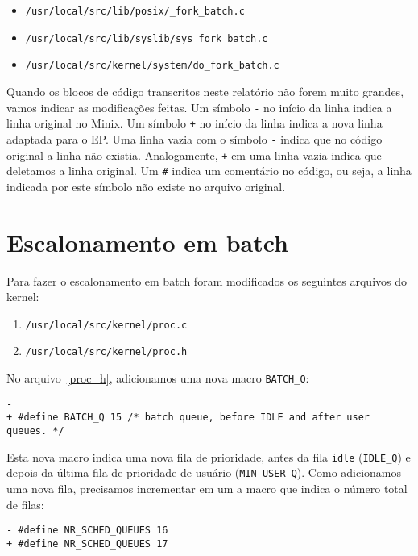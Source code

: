\documentclass{amsart}
\theoremstyle{plain}
\newcommand{\code}[1]{\lstinline[mathescape=true]{#1}}
\begin{document}
\begin{itemize}
  \item \code{/usr/local/src/lib/posix/_fork_batch.c}
  \item \code{/usr/local/src/lib/syslib/sys_fork_batch.c}
  \item \code{/usr/local/src/kernel/system/do_fork_batch.c}
\end{itemize}

Quando os blocos de código transcritos neste relatório não forem muito grandes, vamos indicar as
modificações feitas. Um símbolo \code{-} no início da linha indica a linha original no Minix. Um
símbolo \code{+} no início da linha indica a nova linha adaptada para o EP\@. Uma linha vazia com o
símbolo \code{-} indica que no código original a linha não existia. Analogamente, \code{+} em uma
linha vazia indica que deletamos a linha original. Um \code{#} indica um comentário no código, ou
seja, a linha indicada por este símbolo não existe no arquivo original.

\section{Escalonamento em batch}

Para fazer o escalonamento em batch foram modificados os seguintes arquivos do kernel:

\begin{enumerate}
  \item\label{proc_c} \code{/usr/local/src/kernel/proc.c}
  \item\label{proc_h} \code{/usr/local/src/kernel/proc.h}
\end{enumerate}

No arquivo~\ref{proc_h}, adicionamos uma nova macro \code{BATCH_Q}:

\begin{lstlisting}[frame=leftline,mathescape=true,style=nonumbers]
-
+ #define BATCH_Q 15 /* batch queue, before IDLE and after user queues. */
\end{lstlisting}

Esta nova macro indica uma nova fila de prioridade, antes da fila \code{idle} (\code{IDLE_Q}) e
depois da última fila de prioridade de usuário (\code{MIN_USER_Q}). Como adicionamos uma nova fila,
precisamos incrementar em um a macro que indica o número total de filas:

\begin{lstlisting}[frame=leftline,mathescape=true,style=nonumbers]
- #define NR_SCHED_QUEUES 16
+ #define NR_SCHED_QUEUES 17
\end{lstlisting}
\end{document}
